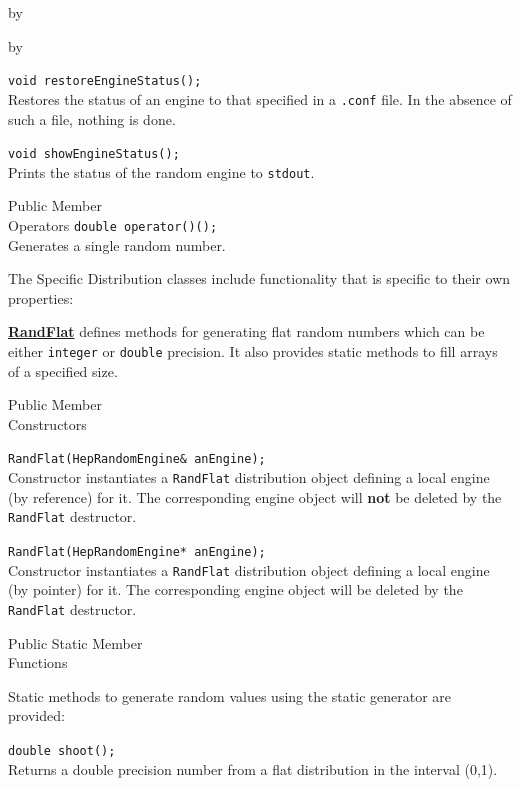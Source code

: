 \documentclass[twoside]{article}
\newcommand{\comp}[1]{\texttt{#1}}%
\newcommand{\entrylabel}[1]{\mbox{\textbf{{#1}}}\hfil}%
\newenvironment{entry}
{\begin{list}{}%
    {\renewcommand{\makelabel}{\entrylabel}%
     \setlength{\labelwidth}{90pt}%
     \setlength{\leftmargin}{\labelwidth}
     \advance\leftmargin by \labelsep%
      }%
    }%
  {\end{list}}
\newcommand{\Entrylabel}[1]%
{\raisebox{0pt}[1ex][0pt]{\makebox[\labelwidth][l]%
    {\parbox[t]{\labelwidth}{\hspace{0pt}\textbf{{#1}}}}}}
\newenvironment{Entry}%
{\renewcommand{\entrylabel}{\Entrylabel}\begin{entry}}%
  {\end{entry}}
\begin{document}
\begin{description}
\begin{Entry}
\begin{Entry}
    \verb+void restoreEngineStatus();+\\
    Restores the status of an engine to that specified in
    a \comp{.conf} file.  In the absence of such a file,
    nothing is done.

    \verb+void showEngineStatus();+\\
    Prints the status of the random engine to \comp{stdout}.
        
\item[Public Member\\ Operators]
    \verb+double operator()();+\\
    Generates a single random number.
  
    The Specific Distribution classes include functionality that is specific
    to their own properties:
    
    \begin{description}
      \item \underline{\bf RandFlat}  defines methods for generating flat random numbers
        which can be either \comp{integer} or \comp{double} precision.
        It also provides static methods to fill arrays of a specified size.
    \end{description}
    
\item[Public Member\\ Constructors]
  
    \verb+RandFlat(HepRandomEngine& anEngine);+\\
    Constructor instantiates a \comp{RandFlat} distribution
    object defining a local engine (by reference) for it.  The
    corresponding engine object will {\bf not} be deleted by the
    \comp{RandFlat} destructor.
     
    \verb+RandFlat(HepRandomEngine* anEngine);+\\
    Constructor instantiates a \comp{RandFlat} distribution
    object defining a local engine (by pointer) for it.
    The corresponding engine object will be deleted by the
    \comp{RandFlat} destructor.

\item[Public Static Member\\ Functions]
  
    Static methods to generate random values using the static generator
    are provided:

    \verb+double shoot();+\\
    Returns a double precision number from a flat distribution
    in the interval (0,1).
    

\end{Entry}
\end{Entry}
\end{description}
\end{document}
